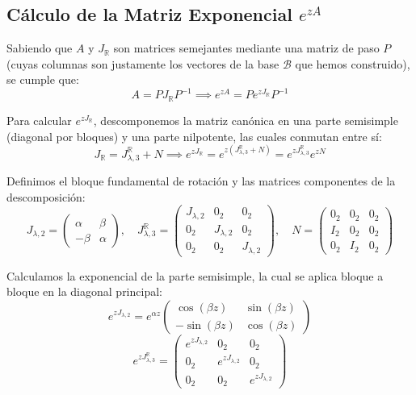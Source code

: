 {    \subsection*{Cálculo de la Matriz Exponencial $e^{zA}$}

    Sabiendo que $A$ y $J_\mathbb{R}$ son matrices semejantes mediante una matriz de paso $P$ (cuyas columnas son justamente los vectores de la base $\mathcal{B}$ que hemos construido), se cumple que:
    \[
        A = P J_\mathbb{R} P^{-1} \implies e^{zA} = P e^{z J_\mathbb{R}} P^{-1}
    \]

    Para calcular $e^{z J_\mathbb{R}}$, descomponemos la matriz canónica en una parte semisimple (diagonal por bloques) y una parte nilpotente, las cuales conmutan entre sí:
    \[
        J_\mathbb{R} = J^{\mathbb{R}}_{\lambda,3} + N \implies e^{z J_\mathbb{R}} = e^{z(J^{\mathbb{R}}_{\lambda,3}+N)} = e^{z J^{\mathbb{R}}_{\lambda,3}} e^{zN} 
    \]

    Definimos el bloque fundamental de rotación y las matrices componentes de la descomposición:
    \[
        J_{\lambda,2} = \begin{pmatrix} \alpha & \beta \\ -\beta & \alpha \end{pmatrix}, \quad 
        J^{\mathbb{R}}_{\lambda,3} = \begin{pmatrix} J_{\lambda,2} & 0_2 & 0_2 \\ 0_2 & J_{\lambda,2} & 0_2 \\ 0_2 & 0_2 & J_{\lambda,2} \end{pmatrix}, \quad 
        N = \begin{pmatrix} 0_2 & 0_2 & 0_2 \\ I_2 & 0_2 & 0_2 \\ 0_2 & I_2 & 0_2 \end{pmatrix}
    \]

    Calculamos la exponencial de la parte semisimple, la cual se aplica bloque a bloque en la diagonal principal:
    \[
        e^{z J_{\lambda,2}} = e^{\alpha z} \begin{pmatrix} \cos(\beta z) & \sin(\beta z) \\ -\sin(\beta z) & \cos(\beta z) \end{pmatrix}
    \]
    \[
        e^{z J^{\mathbb{R}}_{\lambda,3}} = 
        \begin{pmatrix}
            e^{z J_{\lambda,2}} & 0_2 & 0_2 \\
            0_2 & e^{z J_{\lambda,2}} & 0_2 \\
            0_2 & 0_2 & e^{z J_{\lambda,2}}
        \end{pmatrix}
    \]

}
